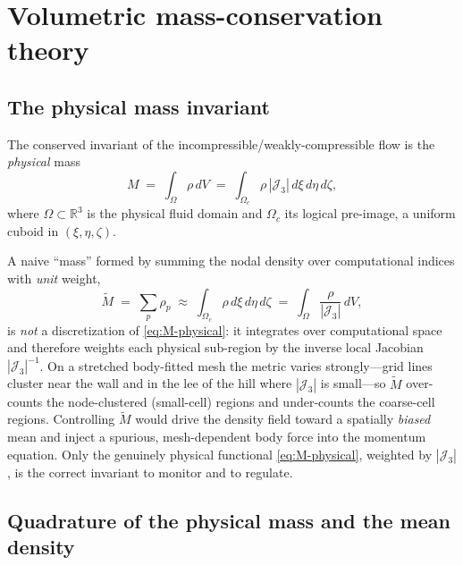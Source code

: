 \documentclass[11pt]{article}
\theoremstyle{definition}
\theoremstyle{remark}
\begin{document}
\section{Volumetric mass-conservation theory}
\label{sec:theory}

\subsection{The physical mass invariant}
\label{sec:T1}

The conserved invariant of the incompressible/weakly-compressible flow is the
\emph{physical} mass
\begin{equation}
M \;=\; \int_{\Omega} \rho\,dV
     \;=\; \int_{\Omega_c} \rho\,|\mathcal{J}_{3}|\,d\xi\,d\eta\,d\zeta,
\label{eq:M-physical}
\end{equation}
where $\Omega\subset\mathbb{R}^3$ is the physical fluid domain and $\Omega_c$ its
logical pre-image, a uniform cuboid in $(\xi,\eta,\zeta)$.

A naive ``mass'' formed by summing the nodal density over computational indices
with \emph{unit} weight,
\begin{equation}
\widetilde{M}
\;=\;\sum_{p}\rho_p
\;\approx\;\int_{\Omega_c}\rho\,d\xi\,d\eta\,d\zeta
\;=\;\int_{\Omega}\frac{\rho}{|\mathcal{J}_{3}|}\,dV ,
\label{eq:Mtilde-wrong}
\end{equation}
is \emph{not} a discretization of \eqref{eq:M-physical}: it integrates over
computational space and therefore weights each physical sub-region by the inverse
local Jacobian $|\mathcal{J}_3|^{-1}$. On a stretched body-fitted mesh the metric
varies strongly---grid lines cluster near the wall and in the lee of the hill
where $|\mathcal{J}_3|$ is small---so $\widetilde{M}$ over-counts the
node-clustered (small-cell) regions and under-counts the coarse-cell regions.
Controlling $\widetilde{M}$ would drive the density field toward a spatially
\emph{biased} mean and inject a spurious, mesh-dependent body force into the
momentum equation. Only the genuinely physical functional \eqref{eq:M-physical},
weighted by $|\mathcal{J}_3|$, is the correct invariant to monitor and to
regulate.

\subsection{Quadrature of the physical mass and the mean density}
\label{sec:T2}
\end{document}

